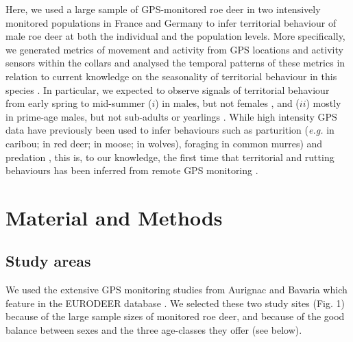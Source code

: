 \documentclass[a4paper,11pt]{article}
\begin{document}
Here, we used a large sample of GPS-monitored roe deer in two
intensively monitored populations in France and Germany to infer
territorial behaviour of male roe deer at both the individual and the
population levels. More specifically, we generated metrics of movement
and activity from GPS locations and activity sensors within the
collars and analysed the temporal patterns of these metrics in
relation to current knowledge on the seasonality of territorial
behaviour in this species \citep{andersen_social_1998}. In particular,
we expected to observe signals of territorial behaviour from early
spring to mid-summer ($i$) in males, but not females
\citep{andersen_mating_1998}, and ($ii$) mostly in prime-age males,
but not sub-adults or yearlings \citep{vanpe_age-specific_2009}. While
high intensity GPS data have previously been used to infer behaviours
such as parturition (\textit{e.g.} \cite{demars_inferring_2013} in
caribou; \cite{asher_use_2014} in red deer; \cite{severud_using_2015}
in moose; \cite{walsh_estimating_2016} in wolves), foraging
\cite{evans_foraging_2013} in common murres) and predation \citep[][
in bears]{krofel_use_2013,cristescu_predicting_2015}, this is, to our
knowledge, the first time that territorial and rutting behaviours has
been inferred from remote GPS monitoring \citep[but see][on lekking in
little bustards]{silva_spatial_2017}.

\section*{Material and Methods}
\subsection*{Study areas}

We used the extensive GPS monitoring studies from Aurignac and Bavaria
which feature in the EURODEER database \citep{cagnacci_partial_2011}. We
selected these two study sites (Fig. 1) because of the large sample
sizes of monitored roe deer, and because of the good balance between sexes and the three age-classes they offer (see below).
\end{document}
